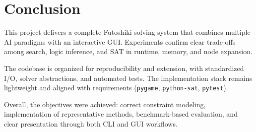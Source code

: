 \section{Conclusion}
This project delivers a complete Futoshiki-solving system that combines multiple AI paradigms with an interactive GUI. Experiments confirm clear trade-offs among search, logic inference, and SAT in runtime, memory, and node expansion.

The codebase is organized for reproducibility and extension, with standardized I/O, solver abstractions, and automated tests. The implementation stack remains lightweight and aligned with requirements (\texttt{pygame}, \texttt{python-sat}, \texttt{pytest}).

Overall, the objectives were achieved: correct constraint modeling, implementation of representative methods, benchmark-based evaluation, and clear presentation through both CLI and GUI workflows.